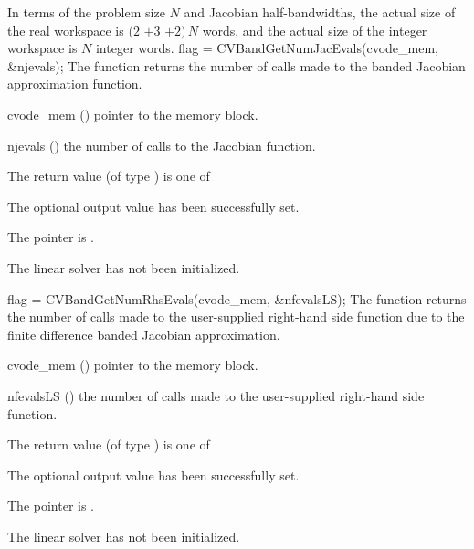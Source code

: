 {
  In terms of the problem size $N$ and Jacobian half-bandwidths, 
  the actual size of the real workspace is
  $(2$ $+ 3$ $+ 2)\, N$  words,
  and the actual size of the integer workspace is $N$ integer words.
}
{
  flag = CVBandGetNumJacEvals(cvode\_mem, \&njevals);
}
{
  The function  returns the
  number of calls made to the banded Jacobian approximation function.
}
{
  \begin{args}
  \item[cvode\_mem] ()
    pointer to the {\cvodes} memory block.
  \item[njevals] ()
    the number of calls to the Jacobian function.
  \end{args}
}
{
  The return value  (of type ) is one of
  \begin{args}
  \item[\Id{CVBAND\_SUCCESS}] 
    The optional output value has been successfully set.
  \item[\Id{CVBAND\_MEM\_NULL}]
    The  pointer is .
  \item[\Id{CVBAND\_LMEM\_NULL}]
    The {\cvband} linear solver has not been initialized.
  \end{args}
}
{}
{
  flag = CVBandGetNumRhsEvals(cvode\_mem, \&nfevalsLS);
}
{
  The function  returns the
  number of calls made to the user-supplied right-hand side function due to the 
  finite difference banded Jacobian approximation.
}
{
  \begin{args}
  \item[cvode\_mem] ()
    pointer to the {\cvodes} memory block.
  \item[nfevalsLS] ()
    the number of calls made to the user-supplied right-hand side function.
  \end{args}
}
{
  The return value  (of type ) is one of
  \begin{args}
  \item[\Id{CVBAND\_SUCCESS}] 
    The optional output value has been successfully set.
  \item[\Id{CVBAND\_MEM\_NULL}]
    The  pointer is .
  \item[\Id{CVBAND\_LMEM\_NULL}]
    The {\cvband} linear solver has not been initialized.
  \end{args}
}
